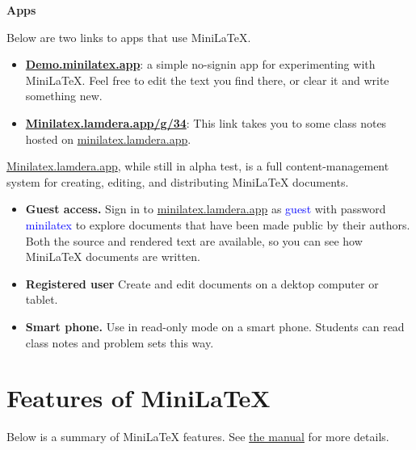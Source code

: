 \documentclass[11pt, oneside]{article}
\newcommand{\strong}[1]{{\bf #1}}
\newcommand{\subheading}[1]{{\bf #1}\par}
\newcommand{\blue}[1]{\textcolor{blue}{#1}}
\begin{document}
 \subheading{Apps}
Below  are  two  links  to   apps  that  use   MiniLaTeX.


\begin{itemize}
\item  \strong{ \href{https://demo.minilatex.app}{Demo.minilatex.app}}:  a  simple  no-signin  app  for  experimenting  with  MiniLaTeX.   Feel  free  to  edit  the  text  you  find  there,  or  clear  it  and  write  something  new.



 \item  \strong{ \href{https://minilatex.lamdera.app/g/34}{Minilatex.lamdera.app/g/34}}:   This  link  takes  you  to  some  class  notes
 hosted  on   \href{https://minilatex.lamdera.app}{minilatex.lamdera.app}.
\end{itemize}

 \href{https://minilatex.lamdera.app}{Minilatex.lamdera.app},  while  still  in  alpha  test,  is  a  full  content-management  system  for  creating,  editing,  and  distributing  MiniLaTeX  documents.


\begin{itemize}
\item  \strong{Guest  access.} Sign  in  to   \href{https://minilatex.lamdera.app}{minilatex.lamdera.app} as   \blue{guest} with  password   \blue{minilatex} to  explore  documents  that  have  been  made  public  by  their  authors.   Both  the  source  and  rendered  text  are  available,  so  you  can  see  how  MiniLaTeX  documents  are  written.



 \item  \strong{Registered  user} Create  and  edit  documents  on  a  dektop  computer  or  tablet.



 \item  \strong{Smart  phone.} Use  in  read-only  mode  on  a  smart  phone.  Students  can  read  class  notes  and  problem  sets  this  way.
\end{itemize}



 \section{Features  of  MiniLaTeX}
Below  is  a  summary  of  MiniLaTeX  features.  See   \href{https://minilatex.lamdera.app/g/21}{the  manual} for  more  details.
\end{document}
